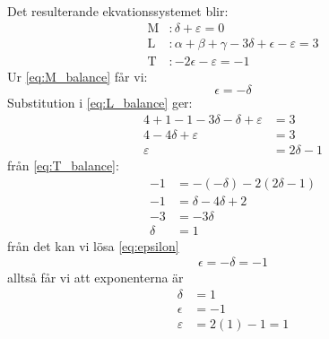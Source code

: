 \documentclass[a4paper,12pt]{article}
\begin{document}
%
Det resulterande ekvationssystemet blir:
\begin{align}
    \mathrm{M}&: \delta + \varepsilon = 0 \label{eq:M_balance} \\
    \mathrm{L}&: \alpha + \beta + \gamma - 3\delta + \epsilon - \varepsilon = 3 \label{eq:L_balance} \\
    \mathrm{T}&: -2\epsilon - \varepsilon = -1 \label{eq:T_balance}
\end{align}
%
Ur \cref{eq:M_balance} får vi:
\begin{equation}
    \epsilon = -\delta \label{eq:epsilon}
\end{equation}
%
Substitution i \cref{eq:L_balance} ger:
\begin{align}
    4 + 1 - 1 - 3\delta - \delta + \varepsilon &= 3 \\
    4 - 4\delta + \varepsilon &= 3 \\
    \varepsilon &= 2\delta - 1
\end{align}
%
från \cref{eq:T_balance}:
\begin{align}
    -1 &= -(-\delta) - 2(2\delta - 1) \\
    -1 &= \delta - 4\delta + 2 \\
    -3 &= -3\delta \\
    \delta &= 1
\end{align}
%
från det kan vi lösa \cref{eq:epsilon}
\begin{align}
    \epsilon = -\delta = -1
\end{align}
alltså får vi att exponenterna är
\begin{align}
    \delta &= 1 \\
    \epsilon &= -1 \\
    \varepsilon &= 2(1) - 1 = 1
\end{align}
%
\newpage
\end{document}
